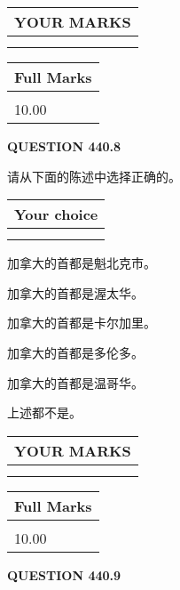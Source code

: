 \documentclass{ctexart}
\begin{document}
\noindent\begin{tabular}{|l|}
\hline
 YOUR MARKS  \\
\hline
 \\ 
 \\ 
\hline
\end{tabular}
\hspace{0.05in} \begin{tabular}{|l|}
\hline
 Full Marks  \\
\hline
 \\ 
10.00 \\
\hline
\end{tabular}
{\textbf{\Large{QUESTION
440.8 
}}}
  
  
请从下面的陈述中选择正确的。
  
  
\noindent\hspace{3.0in} \begin{tabular}{|l|}
\hline
Your choice \\
\hline
 \\ 
 \\ 
\hline
\end{tabular}
  
  
 
 
加拿大的首都是魁北克市。
 
 
加拿大的首都是渥太华。
 
 
加拿大的首都是卡尔加里。
 
 
加拿大的首都是多伦多。
 
 
加拿大的首都是温哥华。
 
 
 上述都不是。
 
 
  
\vspace{0.2in}
  
\noindent\begin{tabular}{|l|}
\hline
 YOUR MARKS  \\
\hline
 \\ 
 \\ 
\hline
\end{tabular}
\hspace{0.05in} \begin{tabular}{|l|}
\hline
 Full Marks  \\
\hline
 \\ 
10.00 \\
\hline
\end{tabular}
{\textbf{\Large{QUESTION
440.9 
}}}
  
\end{document}
